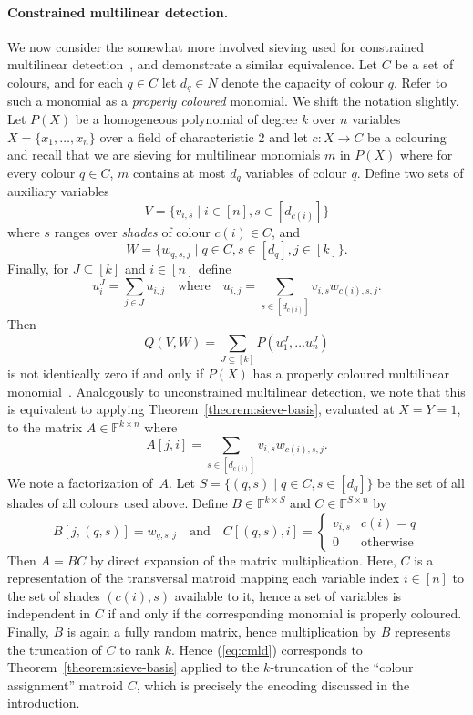 \documentclass[10pt,a4paper]{article}
\newcommand{\F}{\ensuremath{\mathbb F}\xspace}
\begin{document}
\paragraph{Constrained multilinear detection.}
We now consider the somewhat more involved sieving used for
constrained multilinear detection~\cite{BjorklundKK16},
and demonstrate a similar equivalence.
Let $C$ be a set of colours,  and for each $q \in C$
let $d_q \in N$ denote the capacity of colour $q$.
Refer to such a monomial as a \emph{properly coloured} monomial.
We shift the notation slightly. 
Let $P(X)$ be a homogeneous polynomial of degree $k$ over $n$
variables $X=\{x_1,\ldots,x_n\}$ over a field of characteristic 2 and let $c \colon X \to C$
be a colouring and recall that we are sieving for multilinear
monomials $m$ in $P(X)$ where for every colour $q \in C$,
$m$ contains at most $d_q$ variables of colour $q$.
Define two sets of auxiliary variables
\[
  V=\{v_{i,s} \mid i \in [n], s \in [d_{c(i)}]\}
\]
where $s$ ranges over \emph{shades} of colour $c(i) \in C$,
and
\[
  W=\{w_{q,s,j} \mid q \in C, s \in [d_q], j \in [k]\}.
\]
Finally, for $J \subseteq [k]$ and $i \in [n]$ define
\[
  u_i^J = \sum_{j \in J} u_{i,j} \quad \text{where} \quad
  u_{i,j} = \sum_{s \in [d_{c(i)}]} v_{i,s} w_{c(i),s,j}.
\]
Then
\begin{equation}
  Q(V,W) = \sum_{J \subseteq [k]} P(u_1^J, \ldots u_n^J)
  \label{eq:cmld}
\end{equation}
is not identically zero if and only if $P(X)$ has a properly coloured 
multilinear monomial~\cite{BjorklundKK16}. 
Analogously to unconstrained multilinear detection,
we note that this is equivalent to applying Theorem~\ref{theorem:sieve-basis},
evaluated at $X=Y=1$, to the matrix $A \in \F^{k \times n}$
where
\[
  A[j,i] = \sum_{s \in [d_{c(i)}]} v_{i,s} w_{c(i),s,j}.
\]
We note a factorization of~$A$. Let $S=\{(q,s) \mid q \in C, s \in [d_q]\}$
be the set of all shades of all colours used above. 
Define $B \in \F^{k \times S}$ and $C \in \F^{S \times n}$
by
\[
  B[j,(q,s)] = w_{q,s,j} \quad \text{and} \quad
  C[(q,s),i] = 
  \begin{cases}
    v_{i,s} & c(i)=q \\
    0 & \text{otherwise}
  \end{cases}
\]
Then $A=BC$ by direct expansion of the matrix multiplication.
Here, $C$ is a representation of the transversal matroid
mapping each variable index $i \in [n]$
to the set of shades $(c(i),s)$ available to it,
hence a set of variables is independent in $C$
if and only if the corresponding monomial is properly coloured.
Finally, $B$ is again a fully random matrix, hence
multiplication by $B$ represents the truncation of $C$ to rank $k$.
Hence (\ref{eq:cmld}) corresponds to Theorem~\ref{theorem:sieve-basis}
applied to the $k$-truncation of the ``colour assignment'' matroid $C$,
which is precisely the encoding discussed in the introduction.
\end{document}
